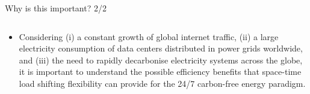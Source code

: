 \begin{frame}{Why is this important? 2/2}
{\begin{columns}[T]
\begin{column}{9cm}
\begin{itemize}
        \item Considering (i) a constant growth of global internet traffic, (ii) a large electricity consumption of data centers distributed in power grids worldwide, and (iii) the need to rapidly decarbonise electricity systems across the globe, it is \alert{important to understand the possible efficiency benefits that space-time load shifting flexibility can provide for the 24/7 carbon-free energy paradigm}. 

      \end{itemize}
      \end{column}
  

    \end{columns}

  }
\end{frame}



